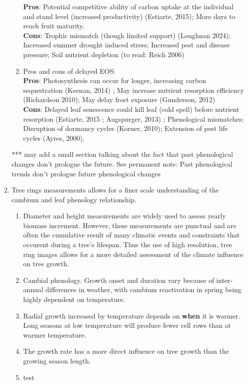 \documentclass{article}
\begin{document}
\begin{enumerate}
\begin{enumerate}
\textbf{Pros}: Potential competitive ability of carbon uptake at the individual and stand level (increased productivity) (Estiarte, 2015); More days to reach fruit maturity. \\ 
\textbf{Cons}: Trophic mismatch (though limited support) (Loughnan 2024); Increased summer drought induced stress; Increased pest and disease pressure; Soil nutrient depletion (to read: Reich 2006)
\item Pros and cons of delayed EOS: \\
\textbf{Pros}: Photosynthesis can occur for longer, increasing carbon sequestration (Keenan, 2014) ; May increase nutrient resorption efficiency (Richardson 2010); May delay frost exposure (Gunderson, 2012)\\ 
\textbf{Cons}: Delayed leaf senescence could kill leaf (cold spell) before nutrient resorption (Estiarte, 2015 ; Augspurger, 2013) ; Phenological mismatches; Disruption of dormancy cycles (Korner, 2010); Extension of pest life cycles (Ayres, 2000).
\end{enumerate}

*** may add a small section talking about the fact that past phenological changes don't prologue the future. See permanent note: Past phenological trends don't prologue future phenological changes

\item Tree rings measurements allows for a finer scale understanding of the cambium and leaf phenology relationship.
\begin{enumerate}
\item  Diameter and height measurements are widely used to assess yearly biomass increment. However, these measurements are punctual and are often the cumulative result of many climatic events and constraints that occurent during a tree's lifespan. Thus the use of high resolution, tree ring images allows for a more detailed assessment of the climate influence on tree growth.
\item Cambial phenology. Growth onset and duration vary because of inter-annual differences in weather, with cambium reactivation in spring being highly dependent on temperature. 
\item Radial growth increased by temperature depends on \textbf{when} it is warmer. Long seasons at low temperature will produce fewer cell rows than at warmer temperature. 
\item The growth rate has a more direct influence on tree growth than the growing season length. 
\item test
\end{enumerate}

\end{enumerate}
\end{document}
